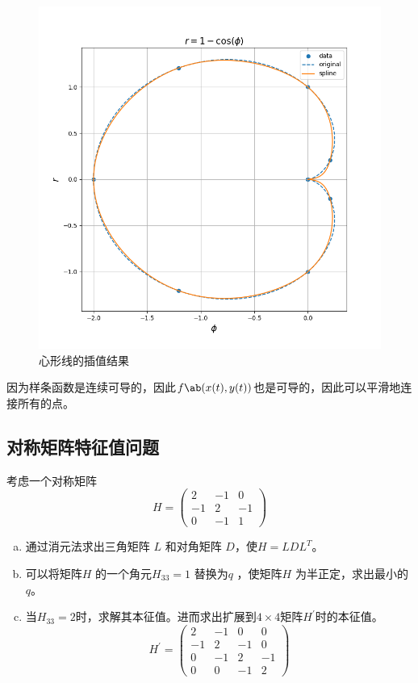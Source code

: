 \documentclass[12pt, a4paper, oneside]{article}
\begin{document}
\begin{figure}[H]
    \centering
    \includegraphics[width=1.0\textwidth]{fig5.png}
    \caption{心形线的插值结果}
\end{figure}
因为样条函数是连续可导的，因此$f\ab(x(t),y(t))$也是可导的，因此可以平滑地连接所有的点。

\subsection{对称矩阵特征值问题}
考虑一个对称矩阵
$$H=\begin{pmatrix}
    2 & -1 & 0 \\
    -1 & 2 & -1 \\
    0 & -1 & 1
\end{pmatrix}$$
\begin{enumerate}[(a)]
    \item 通过消元法求出三角矩阵 $L$ 和对角矩阵 $D$，使$H=LDL^T$。
    \item 可以将矩阵$H$ 的一个角元$H_{33} = 1$ 替换为$q$ ，使矩阵$H$ 为半正定，求出最小的$q$。
    \item 当$H_{33} = 2$时，求解其本征值。进而求出扩展到$4\times 4$矩阵$H^\prime$时的本征值。
    $$H^\prime=\begin{pmatrix}
        2 & -1 & 0 & 0 \\
        -1 & 2 & -1 & 0 \\
        0 & -1 & 2 & -1 \\
        0 & 0 & -1 & 2
    \end{pmatrix}$$
\end{enumerate}
\end{document}
